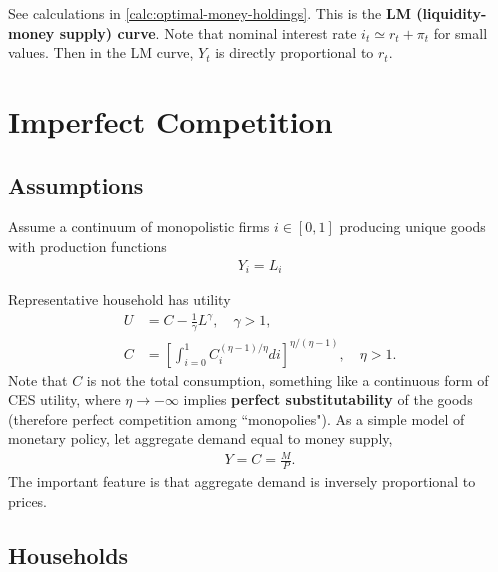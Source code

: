 \documentclass{article}
\newcommand{\?}{\textcolor{red}{(?)}} %
\begin{document}
        See calculations in \eqref{calc:optimal-money-holdings}. This is the \textbf{LM (liquidity-money supply) curve}. Note that nominal interest rate $i_t \simeq r_t + \pi_t$ for small values. Then in the LM curve, $Y_t$ is directly proportional to $r_t$.
    
        
    
    \section{Imperfect Competition}
    
    \subsection{Assumptions}
        
        Assume a continuum of monopolistic firms $i \in [0, 1]$ producing unique goods with production functions
        \begin{align}
            Y_{i} = L_{i}
        \end{align}
        
        Representative household has utility
        \begin{align}
            U &= C - \frac{1}{\gamma} L^{\gamma}, \quad \gamma > 1,
            \\
            C &= \left[
                \int_{i=0}^1 C_i^{(\eta - 1)/\eta} di
            \right]^{\eta / (\eta - 1)},
            \quad \eta > 1.
            \label{eqn:impcomp-consumption-utility}
        \end{align}
        Note that $C$ is not the total consumption, something like a continuous form of CES utility, where $\eta \to -\infty$ implies \textbf{perfect substitutability} of the goods (therefore perfect competition among ``monopolies"). As a simple model of monetary policy, let aggregate demand equal to money supply,
        \begin{align}
            Y = C = \frac{M}{P}.
        \end{align}
        The important feature is that aggregate demand is inversely proportional to prices.
        
    \subsection{Households}
        
\end{document}
